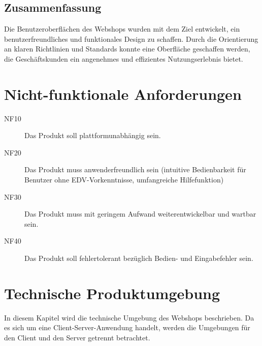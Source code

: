 \documentclass[%
	12pt,
	a4paper,
	oneside,
	parskip=full
]{scrbook}
\begin{document}
\section{Zusammenfassung}
Die Benutzeroberflächen des Webshops wurden mit dem Ziel entwickelt, ein benutzerfreundliches und funktionales Design zu schaffen. Durch die Orientierung an klaren Richtlinien und Standards konnte eine Oberfläche geschaffen werden, die Geschäftskunden ein angenehmes und effizientes Nutzungserlebnis bietet.
\chapter{Nicht-funktionale Anforderungen}
\begin{description}
	\item[NF10] Das Produkt soll plattformunabhängig sein.
	\item[NF20] Das Produkt muss anwenderfreundlich sein (intuitive Bedienbarkeit für Benutzer ohne EDV-Vorkenntnisse, umfangreiche Hilfefunktion)
	\item[NF30] Das Produkt muss mit geringem Aufwand weiterentwickelbar und wartbar sein.
	\item[NF40] Das Produkt soll fehlertolerant bezüglich Bedien- und Eingabefehler sein.
\end{description}

\chapter{Technische Produktumgebung}

In diesem Kapitel wird die technische Umgebung des Webshops beschrieben. Da es sich um eine Client-Server-Anwendung handelt, werden die Umgebungen für den Client und den Server getrennt betrachtet.
\end{document}
